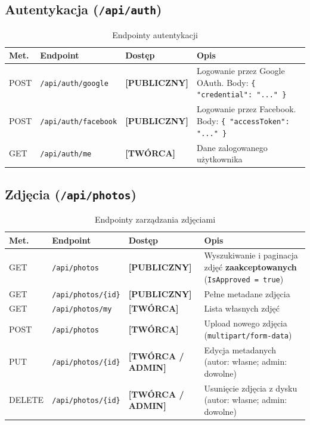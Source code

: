 \documentclass[12pt, a4paper]{article}
\begin{document}
\subsection{Autentykacja (\texttt{/api/auth})}

\begin{table}[H]
  \centering
  \caption{Endpointy autentykacji}
  \begin{tabular}{@{}L{1.5cm}L{4cm}L{2.5cm}L{6cm}@{}}
    \toprule
    \textbf{Met.} & \textbf{Endpoint} & \textbf{Dostęp} & \textbf{Opis} \\
    \midrule
    POST & \texttt{/api/auth/google}   & \textbf{[PUBLICZNY]} & Logowanie przez Google OAuth. Body: \texttt{\{ "credential": "..." \}} \\
    POST & \texttt{/api/auth/facebook} & \textbf{[PUBLICZNY]} & Logowanie przez Facebook. Body: \texttt{\{ "accessToken": "..." \}} \\
    GET  & \texttt{/api/auth/me}       & \textbf{[TWÓRCA]}    & Dane zalogowanego użytkownika \\
    \bottomrule
  \end{tabular}
\end{table}

\subsection{Zdjęcia (\texttt{/api/photos})}

\begin{table}[H]
  \centering
  \caption{Endpointy zarządzania zdjęciami}
  \begin{tabular}{@{}L{1.5cm}L{4.5cm}L{2.5cm}L{5.5cm}@{}}
    \toprule
    \textbf{Met.} & \textbf{Endpoint} & \textbf{Dostęp} & \textbf{Opis} \\
    \midrule
    GET    & \texttt{/api/photos}        & \textbf{[PUBLICZNY]}         & Wyszukiwanie i paginacja zdjęć \textbf{zaakceptowanych} (\texttt{IsApproved = true}) \\
    GET    & \texttt{/api/photos/\{id\}} & \textbf{[PUBLICZNY]}         & Pełne metadane zdjęcia \\
    GET    & \texttt{/api/photos/my}     & \textbf{[TWÓRCA]}            & Lista własnych zdjęć \\
    POST   & \texttt{/api/photos}        & \textbf{[TWÓRCA]}            & Upload nowego zdjęcia (\texttt{multipart/form-data}) \\
    PUT    & \texttt{/api/photos/\{id\}} & \textbf{[TWÓRCA / ADMIN]}    & Edycja metadanych (autor: własne; admin: dowolne) \\
    DELETE & \texttt{/api/photos/\{id\}} & \textbf{[TWÓRCA / ADMIN]}    & Usunięcie zdjęcia z dysku (autor: własne; admin: dowolne) \\
    \bottomrule
  \end{tabular}
\end{table}
\end{document}
